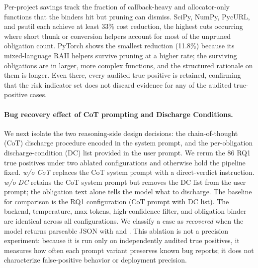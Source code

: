 Per-project savings track the fraction of callback-heavy and
allocator-only functions that the binders hit but pruning can
dismiss. SciPy, NumPy, PycURL, and psutil each achieve at least 33\%
cost reduction, the highest cuts occurring where short thunk or
conversion helpers account for most of the unpruned obligation count.
PyTorch shows the smallest reduction (11.8\%) because its
mixed-language RAII helpers survive pruning at a higher rate; the
surviving obligations are in larger, more complex functions, and the
structured rationale on them is longer. Even there, every audited true
positive is retained, confirming that the risk indicator set
does not discard evidence for any of the audited true-positive cases.

\paragraph{Bug recovery effect of CoT prompting and Discharge
Conditions.}
We next isolate the two reasoning-side design decisions: the
chain-of-thought (CoT) discharge procedure encoded in the system
prompt, and the per-obligation discharge-condition (DC) list provided
in the user prompt. We rerun the 86 RQ1 true positives under two
ablated configurations and otherwise hold the pipeline fixed.
\textit{w/o CoT} replaces the CoT system prompt with a direct-verdict
instruction. \textit{w/o DC} retains the CoT system prompt but removes
the DC list from the user prompt; the obligation text alone tells the
model what to discharge. The baseline for comparison is the RQ1
configuration (CoT prompt with DC list). The backend, temperature, max
tokens, high-confidence filter, and obligation binder are identical
across all configurations. We classify a case as \emph{recovered} when
the model returns parseable JSON with  and
. This ablation is not a precision experiment:
because it is run only on independently audited true positives, it
measures how often each prompt variant preserves known bug reports; it
does not characterize false-positive behavior or deployment precision.

